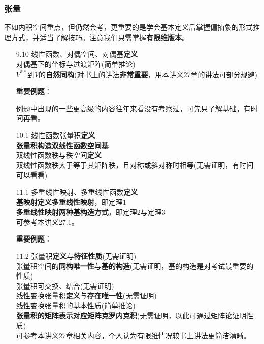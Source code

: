 \documentclass[a4paper,UTF8,fontset=windows,AutoFakeBold]{ctexart}
\newcommand*{\note}{\noindent *}
\begin{document}
\subsubsection{张量}
不如内积空间重点，但仍然会考，更重要的是学会基本定义后掌握偏抽象的形式推理方式，并适当了解技巧。注意我们只需掌握\textbf{有限维版本}。

\begin{enumerate}
    \item[9.10] 线性函数、对偶空间、对偶基\textbf{定义}
    \\对偶基下的坐标与过渡矩阵(简单推论)
    \\$V^{**}$到$V$的\textbf{自然同构}(对书上的讲法\textbf{非常重要}，用本讲义27章的讲法可部分规避)

    \textbf{重要例题}：
    \note 例题中出现的一些更高级的内容往年来看没有考察过，可先只了解基础，有时间再看。

    \item[10.1] 线性函数张量积\textbf{定义}
    \\\textbf{张量积构造双线性函数空间基}
    \\双线性函数秩与秩空间\textbf{定义}
    \\双线性函数秩大于等于其矩阵秩，且对称或斜对称时相等(无需证明，有时间可以看看)

    \item[11.1] 多重线性映射、多重线性函数\textbf{定义}
    \\\textbf{基映射定义多重线性映射}，即定理1
    \\\textbf{多重线性映射两种基构造方式}，即定理2与定理3
    \\\note 可参考本讲义27.1。

    \textbf{重要例题}：
    \item[11.2] 张量积\textbf{定义}与\textbf{特征性质}(无需证明)
    \\张量积空间的\textbf{同构唯一性}与\textbf{基的构造}(无需证明，基的构造是对考试最重要的性质)
    \\张量积可交换、结合(无需证明)
    \\线性变换张量积\textbf{定义}与\textbf{存在唯一性}(无需证明)
    \\线性变换张量积的基本性质(简单推论)
    \\\textbf{张量积的矩阵表示对应矩阵克罗内克积}(无需证明，以此可通过矩阵论证明性质)
    \\\note 可参考本讲义27章相关内容，个人认为有限维情况较书上讲法更简洁清晰。


\end{enumerate}
\end{document}

